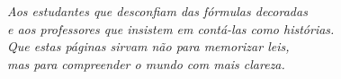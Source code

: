 \cleardoublepage
\thispagestyle{empty}

\vspace*{\fill}
\begin{flushleft}
\emph{Aos estudantes que desconfiam das fórmulas decoradas\\
e aos professores que insistem em contá-las como histórias.\\
Que estas páginas sirvam não para memorizar leis,\\
mas para compreender o mundo com mais clareza.}
\end{flushleft}
\vspace*{\fill}

\cleardoublepage




